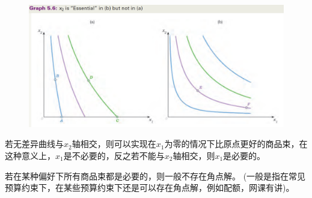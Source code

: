 \documentclass{article}
\begin{document}
\begin{figure}[H] %
	\centering %
	\includegraphics[width=1\textwidth]{5_1} %
	\caption{} %
	\label{Fig.main2} %
\end{figure}

若无差异曲线与$ x_2 $轴相交，则可以实现在$ x_1 $为零的情况下比原点更好的商品束，在这种意义上，$ x_1 $是不必要的，反之若不能与$ x_2 $轴相交，则$ x_1 $是必要的。

若在某种偏好下所有商品束都是必要的，则一般不存在角点解。
(一般是指在常见预算约束下，在某些预算约束下还是可以存在角点解，例如配额，网课有讲)。
\end{document}
